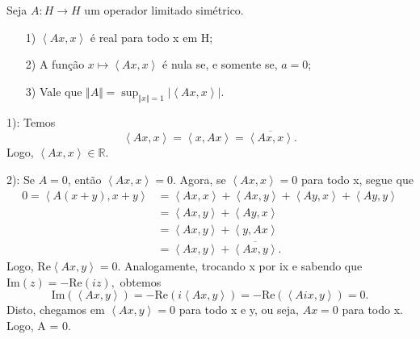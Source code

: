 \documentclass[measure_theory.tex]{subfiles}
\begin{document}
\begin{prop*}
	Seja \(A:H\rightarrow H\) um operador limitado simétrico.
	\begin{itemize}
		\item[1)] \(\left< Ax, x \right>\) é real para todo x em H;
		\item[2)] A função \(x\mapsto \left< Ax, x \right>\) é nula se, e somente se, \(a = 0\);
		\item[3)] Vale que \(\Vert A \Vert = \sup_{\Vert x \Vert = 1}|\left< Ax, x \right>|\).
	\end{itemize}
\end{prop*}
\begin{proof*}
	1): Temos
	\[
		\left< Ax, x \right> = \left< x, Ax \right> = \overline{\left< Ax, x \right>}.
	\]
	Logo, \(\left< Ax, x \right>\in \mathbb{R}.\)

	2): Se \(A = 0\), então \(\left< Ax, x \right> = 0.\) Agora, se \(\left< Ax, x \right> = 0\) para todo x, segue que
	\begin{align*}
		0 = \left< A(x+y), x+y \right> & = \left< Ax, x \right> + \left< Ax, y \right> + \left< Ay, x \right> + \left< Ay, y \right> \\
		                               & = \left< Ax, y \right> + \left< Ay, x \right>                                               \\
		                               & = \left< Ax, y \right> + \left< y, Ax \right>                                               \\
		                               & = \left< Ax, y \right> + \overline{\left< Ax, y \right>}.
	\end{align*}
	Logo, \(\mathrm{Re}\left< Ax, y \right> = 0\). Analogamente, trocando x por ix e sabendo que \(\mathrm{Im}(z) = -\mathrm{Re}(iz),\) obtemos
	\[
		\mathrm{Im}(\left< Ax, y \right>) = -\mathrm{Re}(i \left< Ax, y \right>) = - \mathrm{Re}(\left< Aix, y \right>) = 0.
	\]
	Disto, chegamos em \(\left< Ax, y \right> = 0\) para todo x e y, ou seja, \(Ax = 0\) para todo x. Logo, A = 0.


\end{proof*}
\end{document}
